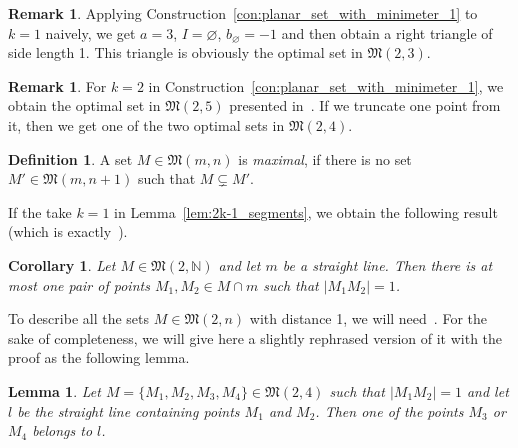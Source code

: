 \documentclass[a4paper,14pt]{article} %
\theoremstyle{plain}
\newtheorem{lemma}[theorem]{Lemma}
\newtheorem{corollary}[theorem]{Corollary}
\theoremstyle{definition}
\newtheorem{definition}[theorem]{Definition}
\newtheorem{remark}[theorem]{Remark}
\begin{document}
\begin{remark}
	\label{rem:planar_set_with_minimeter_1_of_3_points}
	Applying Construction~\ref{con:planar_set_with_minimeter_1} to $k=1$ naively,
	we get $a = 3$, $I=\varnothing$, $b_\varnothing = -1$ and then
	obtain a right triangle of side length 1.
	This triangle is obviously the optimal set in $\mathfrak{M}(2,3)$.
\end{remark}

\begin{remark}
	\label{rem:planar_set_with_minimeter_1_of_4_and_5_points}
	For $k=2$ in Construction~\ref{con:planar_set_with_minimeter_1},
	we obtain the optimal set in $\mathfrak{M}(2,5)$ presented in~\cite[Fig. 1]{harborth1993upper}.
	If we truncate one point from it,
	then we get one of the two optimal sets in $\mathfrak{M}(2,4)$.
\end{remark}



\begin{definition}
	\cite{antonov2008maximal}
	A set $M\in \mathfrak{M}(m,n)$ is \textit{maximal},
	if there is no set $M'\in \mathfrak{M}(m,n+1)$
	such that $M \subsetneq M'$.
\end{definition}




If the take $k=1$ in Lemma~\ref{lem:2k-1_segments},
we obtain the following result (which is exactly~\cite[Lemma 3]{our-vmmsh-2018}).
\begin{corollary}
	\label{cor:only_one_distance_1_on_straight_line}
	Let $M \in \mathfrak{M}(2,\mathbb{N})$ and let $m$ be a straight line.
	Then there is at most one pair of points $M_1,M_2\in M \cap m$
	such that $|M_1 M_2| = 1$.
\end{corollary}

To describe all the sets $M \in \mathfrak{M}(2,n)$ with distance 1,
we will need~\cite[Proposition 6]{our-vmmsh-2018}.
For the sake of completeness, we will give here a slightly rephrased version of it with the proof as the following lemma.
\begin{lemma}
	\label{lem:no_4_points_in_semigeneral_position_with_distance_1}
	Let $M=\{M_1,M_2,M_3,M_4\}\in \mathfrak{M}(2,4)$ such that $|M_1 M_2|=1$
	and let $l$ be the straight line containing points $M_1$ and $M_2$.
	Then one of the points $M_3$ or $M_4$ belongs to $l$.
\end{lemma}
\end{document}
